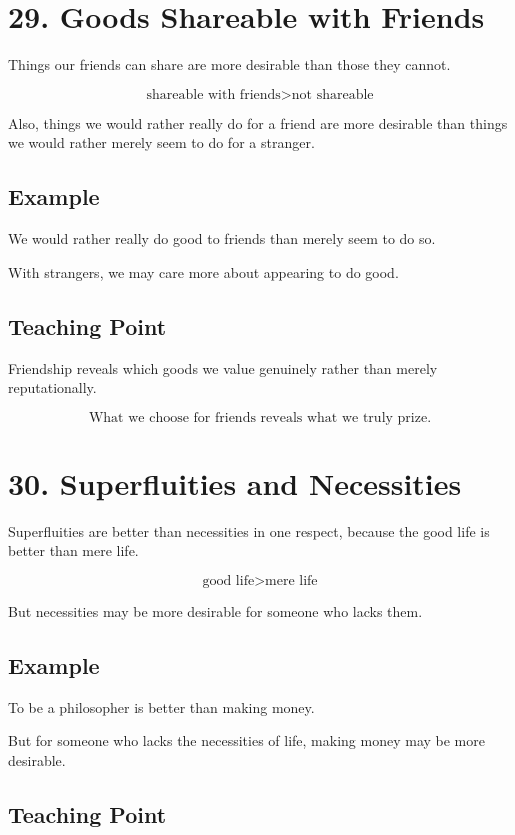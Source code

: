 \documentclass[12pt]{article}
\begin{document}
\section*{29. Goods Shareable with Friends}

Things our friends can share are more desirable than those they cannot.

\[
\text{shareable with friends} > \text{not shareable}
\]

Also, things we would rather really do for a friend are more desirable than
things we would rather merely seem to do for a stranger.

\subsection*{Example}

We would rather really do good to friends than merely seem to do so.

With strangers, we may care more about appearing to do good.

\subsection*{Teaching Point}

Friendship reveals which goods we value genuinely rather than merely
reputationally.

\[
\boxed{
\text{What we choose for friends reveals what we truly prize.}
}
\]

\section*{30. Superfluities and Necessities}

Superfluities are better than necessities in one respect, because the good life
is better than mere life.

\[
\text{good life} > \text{mere life}
\]

But necessities may be more desirable for someone who lacks them.

\subsection*{Example}

To be a philosopher is better than making money.

But for someone who lacks the necessities of life, making money may be more
desirable.

\subsection*{Teaching Point}
\end{document}
